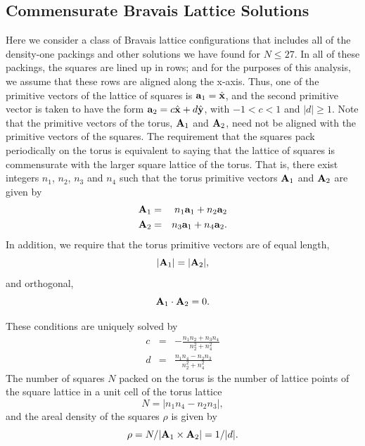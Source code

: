 \documentclass[preprint,aps]{revtex4}
\newcommand{\ax}{{\bf a}_1}
\newcommand{\ay}{{\bf a}_2}
\newcommand{\Ax}{{\bf A}_1}
\newcommand{\Ay}{{\bf A}_2}
\begin{document}
\subsection{Commensurate Bravais Lattice Solutions}
Here we consider a class of Bravais lattice configurations that includes all of the density-one packings and other solutions we have found for  $N \leq 27$.   In all of these packings, the squares are lined up in rows; and for the purposes of this analysis, we assume that these rows are aligned along the x-axis. Thus, one of the primitive vectors of the lattice of squares is $\ax=\hat{{\bf x}}$, and the second primitive vector is taken to have the form $\ay=c \hat{{\bf x}} + d \hat{{\bf y}}$, with $-1< c <1$ and  $|d|\geq 1$.  Note that the primitive vectors of the torus, $\Ax$ and $\Ay$, need not be aligned with the primitive vectors of the squares.     The requirement that the squares pack periodically on the torus is equivalent to saying that the lattice of squares is commensurate with the larger square lattice of the torus.  That is, there exist  integers $n_1$, $n_2$, $n_3$ and $n_4$ such that the torus primitive vectors $\Ax$ and $\Ay$ are given by
\begin{eqnarray} 
\label{eqn:Ana}
\Ax&=& n_1 \ax + n_2 \ay \nonumber \\ 
\Ay&=&n_3 \ax + n_4 \ay.
\end{eqnarray}
In addition, we require that the torus primitive vectors are of equal length,
\begin{equation}
\label{eqn:normal}
|\Ax|=|\Ay| ,
\end{equation}
and orthogonal,
\begin{equation}
\label{eqn:ortho}
\Ax \cdot \Ay = 0 .
\end{equation}

These conditions are uniquely solved by
\begin{eqnarray}\label{eq:gap}
c &=& - \frac{n_1 n_2 + n_3 n_4}{n_2^2 + n_4^2}\\
d &=& \frac{n_1 n_4 - n_2 n_3}{n_2^2 + n_4^2} \nonumber
\end{eqnarray}
The number of squares $N$ packed on the torus is the number of lattice points of the square lattice in a unit cell of the torus lattice
\begin{equation}
\label{eqn:N}
N = |n_1 n_4 - n_2 n_3|,
\end{equation}
and the areal density of the squares $\rho$ is given by
\begin{equation}
\label{ }
\rho=N/|\Ax \times \Ay| = 1/|d|.
\end{equation}
\end{document}
